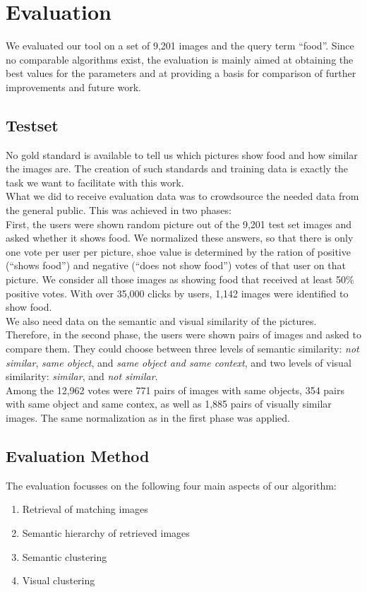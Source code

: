 %
\section{Evaluation}
\label{sec_literatur}

We evaluated our tool on a set of 9,201  images and the query term ``food''. Since no comparable algorithms exist, the evaluation is mainly aimed at obtaining the best values for the parameters and at providing a basis for comparison of further improvements and future work.

\subsection{Testset}
No gold standard is available to tell us which pictures show food and how similar the images are. The creation of such standards and training data is exactly the task we want to facilitate with this work.\\ 
What we did to receive evaluation data was to crowdsource the needed data from the general public. This was achieved in two phases:\\

First, the users were shown random picture out of the 9,201 test set images and asked whether it shows food. We normalized these answers, so that there is only one vote per user per picture, shoe value is determined by the ration of positive (``shows food'') and negative (``does not show food'') votes of that user on that picture. We consider all those images as showing food that received at least 50\% positive votes. With over 35,000 clicks by  users, 1,142 images were identified to show food. \\

We also need data on the semantic and visual similarity of the pictures. Therefore, in the second phase, the users were shown pairs of images and asked to compare them. They could choose between three levels of semantic similarity: \emph{not similar}, \emph{same object}, and \emph{same object and same context}, and two levels of visual similarity: \emph{similar}, and \emph{not similar}.\\
Among the 12,962 votes were 771 pairs of images with same objects, 354 pairs with same object and same contex, as well as 1,885 pairs of visually similar images. The same normalization as in the first phase was applied.

\subsection{Evaluation Method}
The evaluation focusses on the following four main aspects of our algorithm:
\begin{enumerate}
\item Retrieval of matching images
\item Semantic hierarchy of retrieved images
\item Semantic clustering
\item Visual clustering
\end{enumerate}


